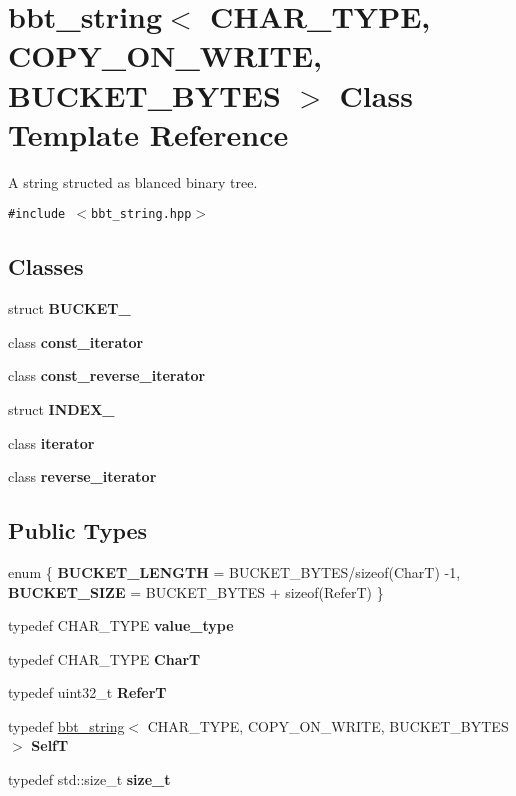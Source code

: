 \hypertarget{classbbt__string}{
\section{bbt\_\-string$<$ CHAR\_\-TYPE, COPY\_\-ON\_\-WRITE, BUCKET\_\-BYTES $>$ Class Template Reference}
\label{classbbt__string}
}
A string structed as blanced binary tree.  


{\tt \#include $<$bbt\_\-string.hpp$>$}

\subsection*{Classes}
\begin{CompactItemize}
\item 
struct \textbf{BUCKET\_\-}
\item 
class \textbf{const\_\-iterator}
\item 
class \textbf{const\_\-reverse\_\-iterator}
\item 
struct \textbf{INDEX\_\-}
\item 
class \textbf{iterator}
\item 
class \textbf{reverse\_\-iterator}
\end{CompactItemize}
\subsection*{Public Types}
\begin{CompactItemize}
\item 
enum \{ \textbf{BUCKET\_\-LENGTH} =  BUCKET\_\-BYTES/sizeof(CharT) -1, 
\textbf{BUCKET\_\-SIZE} =  BUCKET\_\-BYTES + sizeof(ReferT)
 \}
\item 
\hypertarget{classbbt__string_2be9dfbf4aaf66eacfdd0d82a0110890}{
typedef CHAR\_\-TYPE \textbf{value\_\-type}}
\label{classbbt__string_2be9dfbf4aaf66eacfdd0d82a0110890}

\item 
\hypertarget{classbbt__string_00d4b9aaf22751c6f24ba51134913a5d}{
typedef CHAR\_\-TYPE \textbf{CharT}}
\label{classbbt__string_00d4b9aaf22751c6f24ba51134913a5d}

\item 
\hypertarget{classbbt__string_1fd5f49f5cc263307aac18e80b7b2745}{
typedef uint32\_\-t \textbf{ReferT}}
\label{classbbt__string_1fd5f49f5cc263307aac18e80b7b2745}

\item 
\hypertarget{classbbt__string_dc80f1c75343e816704e22349b98f76e}{
typedef \hyperlink{classbbt__string}{bbt\_\-string}$<$ CHAR\_\-TYPE, COPY\_\-ON\_\-WRITE, BUCKET\_\-BYTES $>$ \textbf{SelfT}}
\label{classbbt__string_dc80f1c75343e816704e22349b98f76e}

\item 
\hypertarget{classbbt__string_ee738094d5d75ea3507e65fcbd8cf53e}{
typedef std::size\_\-t \textbf{size\_\-t}}
\label{classbbt__string_ee738094d5d75ea3507e65fcbd8cf53e}

\end{CompactItemize}
